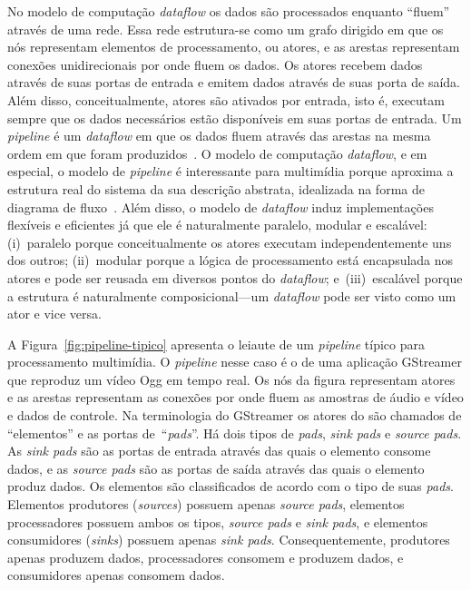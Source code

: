 \documentclass{SBCbookchapter}
\def\en#1{\foreignlanguage{english}{\emph{#1}}}
\begin{document}
No modelo de computação \en{dataflow} os dados são processados enquanto
``fluem'' através de uma rede.  Essa rede estrutura-se como um grafo
dirigido em que os nós representam elementos de processamento, ou atores, e
as arestas representam conexões unidirecionais por onde fluem os dados.  Os
atores recebem dados através de suas portas de entrada e emitem dados
através de suas porta de saída.  Além disso, conceitualmente, atores são
ativados por entrada, isto é, executam sempre que os dados necessários estão
disponíveis em suas portas de entrada.  Um \en{pipeline} é um \en{dataflow}
em que os dados fluem através das arestas na mesma ordem em que foram
produzidos~\cite{Kahn-G-1977,Lee-E-A-1995}.  O modelo de computação
\en{dataflow}, e em especial, o modelo de \en{pipeline} é interessante para
multimídia porque aproxima a estrutura real do sistema da sua descrição
abstrata, idealizada na forma de diagrama de fluxo~\cite{Yviquel-H-2014}.
Além disso, o modelo de \en{dataflow} induz implementações flexíveis e
eficientes já que ele é naturalmente paralelo, modular e escalável:
(i)~paralelo porque conceitualmente os atores executam independentemente uns
dos outros; (ii)~modular porque a lógica de processamento está encapsulada
nos atores e pode ser reusada em diversos pontos do \en{dataflow};
e~(iii)~escalável porque a estrutura é naturalmente composicional---um
\en{dataflow} pode ser visto como um ator e vice versa.

A Figura~\ref{fig:pipeline-tipico} apresenta o leiaute de um \en{pipeline}
típico para processamento multimídia.  O \en{pipeline} nesse caso é o de uma
aplicação GStreamer que reproduz um vídeo Ogg em tempo real.  Os nós da
figura representam atores e as arestas representam as conexões por onde
fluem as amostras de áudio e vídeo e dados de controle.  Na terminologia do
GStreamer os atores do são chamados de ``elementos'' e as portas
de~``\en{pads}''.  Há dois tipos de \en{pads}, \en{sink pads} e \en{source
  pads}.  As \en{sink pads} são as portas de entrada através das quais o
elemento consome dados, e as \en{source pads} são as portas de saída através
das quais o elemento produz dados.  Os elementos são classificados de acordo
com o tipo de suas \en{pads}.  Elementos produtores (\en{sources}) possuem
apenas \en{source pads}, elementos processadores possuem ambos os tipos,
\en{source pads} e \en{sink pads}, e elementos consumidores (\en{sinks})
possuem apenas \en{sink pads}.  Consequentemente, produtores apenas produzem
dados, processadores consomem e produzem dados, e consumidores apenas
consomem dados.
\end{document}
